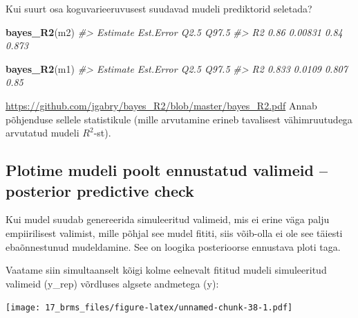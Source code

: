 \documentclass[]{book}
\newenvironment{Shaded}{\begin{snugshade}}{\end{snugshade}}
\newcommand{\KeywordTok}[1]{\textcolor[rgb]{0.13,0.29,0.53}{\textbf{#1}}}
\newcommand{\DataTypeTok}[1]{\textcolor[rgb]{0.13,0.29,0.53}{#1}}
\newcommand{\DecValTok}[1]{\textcolor[rgb]{0.00,0.00,0.81}{#1}}
\newcommand{\StringTok}[1]{\textcolor[rgb]{0.31,0.60,0.02}{#1}}
\newcommand{\CommentTok}[1]{\textcolor[rgb]{0.56,0.35,0.01}{\textit{#1}}}
\newcommand{\OperatorTok}[1]{\textcolor[rgb]{0.81,0.36,0.00}{\textbf{#1}}}
\newcommand{\NormalTok}[1]{#1}
\begin{document}
Kui suurt osa koguvarieeruvusest suudavad mudeli prediktorid seletada?

\begin{Shaded}
\begin{Highlighting}[]
\KeywordTok{bayes_R2}\NormalTok{(m2)}
\CommentTok{#>    Estimate Est.Error Q2.5 Q97.5}
\CommentTok{#> R2     0.86   0.00831 0.84 0.873}
\end{Highlighting}
\end{Shaded}

\begin{Shaded}
\begin{Highlighting}[]
\KeywordTok{bayes_R2}\NormalTok{(m1)}
\CommentTok{#>    Estimate Est.Error  Q2.5 Q97.5}
\CommentTok{#> R2    0.833    0.0109 0.807  0.85}
\end{Highlighting}
\end{Shaded}

\url{https://github.com/jgabry/bayes_R2/blob/master/bayes_R2.pdf} Annab
põhjenduse sellele statistikule (mille arvutamine erineb tavalisest
vähimruutudega arvutatud mudeli \(R^2\)-st).

\subsection{Plotime mudeli poolt ennustatud valimeid -- posterior
predictive
check}\label{plotime-mudeli-poolt-ennustatud-valimeid-posterior-predictive-check}

Kui mudel suudab genereerida simuleeritud valimeid, mis ei erine väga
palju empiirilisest valimist, mille põhjal see mudel fititi, siis
võib-olla ei ole see täiesti ebaõnnestunud mudeldamine. See on loogika
posterioorse ennustava ploti taga.

Vaatame siin simultaanselt kõigi kolme eelnevalt fititud mudeli
simuleeritud valimeid (y\_rep) võrdluses algsete andmetega (y):

\begin{Shaded}
\end{Shaded}

\texttt{[image: 17\_brms\_files/figure-latex/unnamed-chunk-38-1.pdf]}
\end{document}
